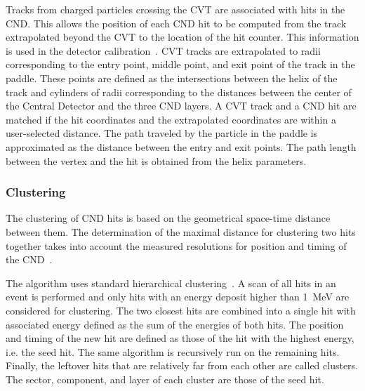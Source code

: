 Tracks from charged particles crossing the CVT are associated with hits in the CND. This allows the position of each CND hit to be computed from the track extrapolated beyond the CVT to the location of the hit counter.
This information is used in the detector calibration~\cite{cnd-nim}. CVT tracks are extrapolated to radii corresponding to the entry point, middle point, and
exit point of the track in the paddle. These points are defined as the intersections between the helix of the track and cylinders of radii corresponding to the distances between the center of the Central Detector and the three CND layers. A CVT track and a CND hit are matched if the hit coordinates and the extrapolated coordinates are within a user-selected distance. 
%
%
%
%
The path traveled by the particle in the paddle is approximated as the distance between the entry and exit points. The path length between the vertex and the
hit is obtained from the helix parameters.

\subsubsection{Clustering}

The clustering of CND hits is based on the geometrical space-time distance between them. The determination of
the maximal distance for clustering two hits together takes into account the measured resolutions for position and
timing of the CND~\cite{cnd-nim}.

The algorithm uses standard hierarchical clustering~\cite{Day1984}. A scan of all hits in an event is performed and
only hits with an energy deposit higher than 1~MeV are considered for clustering. The two closest hits are combined
into a single hit with associated energy defined as the sum of the energies of both hits. The position and timing of
the new hit are defined as those of the hit with the highest energy, i.e. the seed hit. The same algorithm is
recursively run on the remaining hits. Finally, the leftover hits that are relatively far from each other are called
clusters. The sector, component, and layer of each cluster are those of the seed hit.
